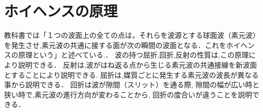 \documentclass[a4j,twocolumn,uplatex]{jarticle}
\begin{document}
\section{ホイヘンスの原理}
教科書では「１つの波面上の全ての点は，それらを波源とする球面波（素元波）を発生させ,素元波の共通に接する面が次の瞬間の波面となる．これをホイヘンスの原理という」と述べている.\cite{kyoukasyo}．
波の持つ屈折,回折,反射の性質は,この原理により説明できる．
反射は,波がはね返る点から生じる素元波の共通接線を新波面とすることにより説明できる.
屈折は,媒質ごとに発生する素元波の波長が異なる事から説明できる．
回折は波が隙間（スリット）を通る際,
隙間の幅が広い時と狭い時で,素元波の進行方向が変わることから,
回折の度合いが違うことを説明できる．
\vspace{-5mm}

\begin{figure}[htbp]

\end{figure}
\end{document}
